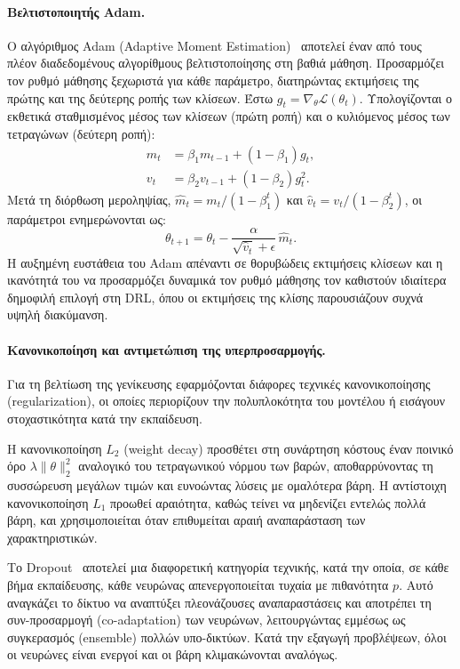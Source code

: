 \paragraph{Βελτιστοποιητής Adam.}
Ο αλγόριθμος Adam (Adaptive Moment Estimation)~\cite{kingma2014adam} 
αποτελεί έναν από τους πλέον διαδεδομένους αλγορίθμους βελτιστοποίησης στη βαθιά μάθηση. 
Προσαρμόζει τον ρυθμό μάθησης ξεχωριστά για κάθε παράμετρο, διατηρώντας εκτιμήσεις της πρώτης και της
δεύτερης ροπής των κλίσεων. Έστω $g_t = \nabla_\theta \mathcal{L}(\theta_t)$.
Υπολογίζονται ο εκθετικά σταθμισμένος μέσος των κλίσεων (πρώτη ροπή) 
και ο κυλιόμενος μέσος των τετραγώνων (δεύτερη ροπή):
\begin{align}
    m_t &= \beta_1 m_{t-1} + (1-\beta_1) g_t, \label{eq:adam-m}\\
    v_t &= \beta_2 v_{t-1} + (1-\beta_2) g_t^{2}. \label{eq:adam-v}
\end{align}
Μετά τη διόρθωση μεροληψίας,
$\hat{m}_t = m_t / (1-\beta_1^{t})$ και
$\hat{v}_t = v_t / (1-\beta_2^{t})$, οι παράμετροι ενημερώνονται ως:
\begin{equation}
    \theta_{t+1} = \theta_t - \frac{\alpha}{\sqrt{\hat{v}_t}+\epsilon}\,\hat{m}_t.
    \label{eq:adam-update}
\end{equation}
Η αυξημένη ευστάθεια του Adam απέναντι σε θορυβώδεις εκτιμήσεις κλίσεων 
και η ικανότητά του να προσαρμόζει δυναμικά τον ρυθμό μάθησης τον καθιστούν 
ιδιαίτερα δημοφιλή επιλογή στη DRL, όπου οι εκτιμήσεις της κλίσης παρουσιάζουν 
συχνά υψηλή διακύμανση.

\paragraph{Κανονικοποίηση και αντιμετώπιση της υπερπροσαρμογής.}
Για τη βελτίωση της γενίκευσης εφαρμόζονται διάφορες τεχνικές
κανονικοποίησης (regularization), οι οποίες περιορίζουν την πολυπλοκότητα
του μοντέλου ή εισάγουν στοχαστικότητα κατά την εκπαίδευση.

Η κανονικοποίηση $L_2$ (weight decay) προσθέτει στη συνάρτηση κόστους
έναν ποινικό όρο $\lambda\lVert\theta\rVert_2^2$ αναλογικό του τετραγωνικού
νόρμου των βαρών, αποθαρρύνοντας τη συσσώρευση μεγάλων τιμών και
ευνοώντας λύσεις με ομαλότερα βάρη. Η αντίστοιχη κανονικοποίηση $L_1$
προωθεί αραιότητα, καθώς τείνει να μηδενίζει εντελώς πολλά βάρη, και
χρησιμοποιείται όταν επιθυμείται αραιή αναπαράσταση των χαρακτηριστικών.

Το Dropout~\cite{srivastava2014dropout} αποτελεί μια διαφορετική κατηγορία
τεχνικής, κατά την οποία, σε κάθε βήμα εκπαίδευσης, κάθε νευρώνας
απενεργοποιείται τυχαία με πιθανότητα $p$. Αυτό αναγκάζει το δίκτυο να
αναπτύξει πλεονάζουσες αναπαραστάσεις και αποτρέπει τη συν-προσαρμογή
(co-adaptation) των νευρώνων, λειτουργώντας εμμέσως ως συγκερασμός
(ensemble) πολλών υπο-δικτύων. Κατά την εξαγωγή προβλέψεων, όλοι οι
νευρώνες είναι ενεργοί και οι βάρη κλιμακώνονται αναλόγως.


